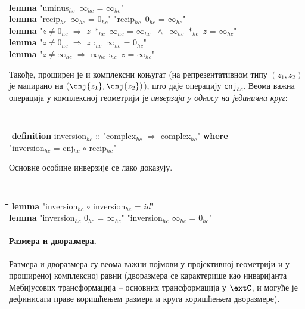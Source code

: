 {\tt
\begin{tabbing}
  {\bf lemma} "uminus$_{hc}$\ $\infty_{hc}$ = $\infty_{hc}$"\\
  {\bf lemma} "recip$_{hc}$\ $\infty_{hc}$ = $0_{hc}$" "recip$_{hc}$\ $0_{hc}$ = $\infty_{hc}$"\\
  {\bf lemma} "$z \neq 0_{hc}$ $\Longrightarrow$ $z$ $*_{hc}$ $\infty_{hc}$ = $\infty_{hc}$ $\ \wedge\ $  $\infty_{hc}$ $*_{hc}$ $z$ = $\infty_{hc}$"\\
  {\bf lemma} "$z \neq 0_{hc}$ $\Longrightarrow$ $z$ $:_{hc}$ $\infty_{hc}$ = $0_{hc}$"\\
  {\bf lemma} "$z \neq \infty_{hc}$ $\Longrightarrow$ $\infty_{hc}$ $:_{hc}$ $z$ = $\infty_{hc}$"
\end{tabbing}
}

Такође, проширен је и комплексни коњугат (на репрезентативном типу
$(z_1, z_2)$ је мапирано на $(\cnj{z_1}, \cnj{z_2})$), што даје
операцију {\tt cnj}$_{hc}$. Веома важна операција у комплексној
геометрији је \emph{инверзија у односу на јединични круг}:

{\tt
\begin{tabbing}
\hspace{5mm}\=\hspace{5mm}\=\hspace{5mm}\=\hspace{5mm}\=\hspace{5mm}\=\kill
{\bf definition} inversion$_{hc}$ :: "complex$_{hc}$ $\Rightarrow$ complex$_{hc}$" {\bf where}\\
\> "inversion$_{hc}$ = cnj$_{hc}$ $\circ$ recip$_{hc}$"
\end{tabbing}
}

Основне особине инверзије се лако доказују.
{\tt
\begin{tabbing}
\hspace{5mm}\=\hspace{5mm}\=\hspace{5mm}\=\hspace{5mm}\=\hspace{5mm}\=\kill
{\bf lemma} "inversion$_{hc}$ $\circ$ inversion$_{hc}$ = $id$"\\
{\bf lemma} "inversion$_{hc}$ $0_{hc}$ = $\infty_{hc}$" "inversion$_{hc}$ $\infty_{hc}$ = $0_{hc}$"
\end{tabbing}
}


\paragraph{Размера и дворазмера.}
Размера и дворазмера су веома важни појмови у пројективној геометрији
и у проширеној комплексној равни (дворазмера се карактерише као
инваријанта Мебијусових трансформација -- основних трансформација у
$\extC$, и могуће је дефинисати праве коришћењем размера и круга
коришћењем дворазмере).


